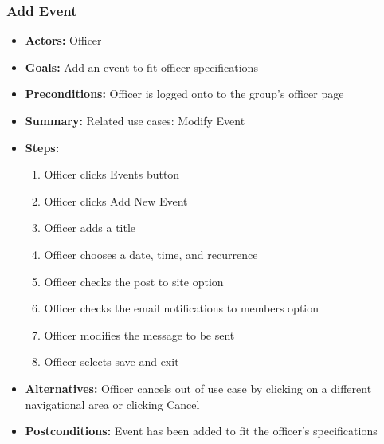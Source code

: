 \documentclass[12pt, oneside, letterpaper]{report}
\begin{document}
		\subsubsection{Add Event}
			\begin{itemize}
				\item{\textbf{Actors:} Officer}
				\item{\textbf{Goals:} Add an event to fit officer specifications}
				\item{\textbf{Preconditions:} Officer is logged onto to the group's officer page}
				\item{\textbf{Summary:} Related use cases: Modify Event}
				\item{\textbf{Steps:}
				\begin{enumerate}
					\item{Officer clicks Events button}
					\item{Officer clicks Add New Event}
					\item{Officer adds a title}
					\item{Officer chooses a date, time, and recurrence}
					\item{Officer checks the post to site option}
					\item{Officer checks the email notifications to members option}
					\item{Officer modifies the message to be sent}
					\item{Officer selects save and exit}
				\end{enumerate}
				}
				\item{\textbf{Alternatives:} Officer cancels out of use case by clicking on a different navigational area or clicking Cancel}
				\item{\textbf{Postconditions:} Event has been added to fit the officer's specifications}
			\end{itemize}
\end{document}
